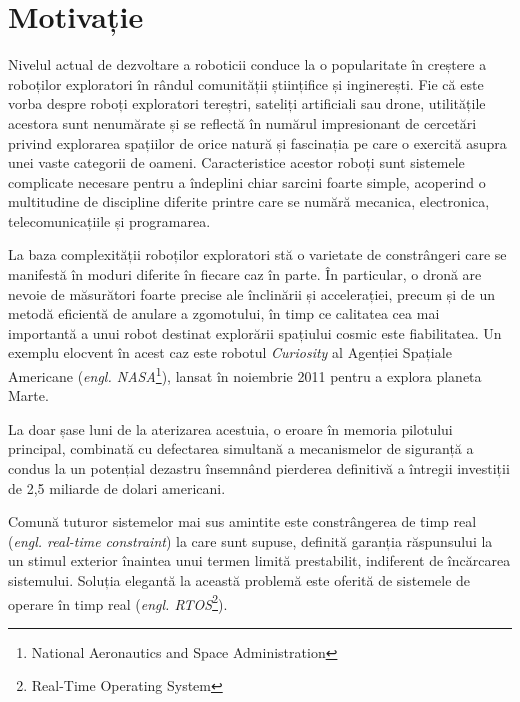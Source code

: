 \section{Motivație}

Nivelul actual de dezvoltare a roboticii conduce la o popularitate în creștere a roboților exploratori în rândul comunității științifice și inginerești. Fie că este vorba despre roboți exploratori tereștri, sateliți artificiali sau drone, utilitățile acestora sunt nenumărate și se reflectă în numărul impresionant de cercetări privind explorarea spațiilor de orice natură și fascinația pe care o exercită asupra unei vaste categorii de oameni. Caracteristice acestor roboți sunt sistemele complicate necesare pentru a îndeplini chiar sarcini foarte simple, acoperind o multitudine de discipline diferite printre care se numără mecanica, electronica, telecomunicațiile și programarea.

La baza complexității roboților exploratori stă o varietate de constrângeri care se manifestă în moduri diferite în fiecare caz în parte. În particular, o dronă are nevoie de măsurători foarte precise ale înclinării și accelerației, precum și de un metodă eficientă de anulare a zgomotului, în timp ce calitatea cea mai importantă a unui robot destinat explorării spațiului cosmic este fiabilitatea. Un exemplu elocvent în acest caz este robotul \textit{Curiosity} al Agenției Spațiale Americane (\textit{engl. NASA}\footnote{National Aeronautics and Space Administration}), lansat în noiembrie 2011 pentru a explora planeta Marte.


La doar șase luni de la aterizarea acestuia, o eroare în memoria pilotului principal, combinată cu defectarea simultană a mecanismelor de siguranță a condus la un potențial dezastru \cite{curiosity} însemnând pierderea definitivă a întregii investiții de 2,5 miliarde de dolari americani.

Comună tuturor sistemelor mai sus amintite este constrângerea de timp real (\textit{engl. real-time constraint}) la care sunt supuse, definită garanția răspunsului la un stimul exterior înaintea unui termen limită prestabilit, indiferent de încărcarea sistemului. Soluția elegantă la această problemă este oferită de sistemele de operare în timp real (\textit{engl. RTOS}\footnote{Real-Time Operating System}).

